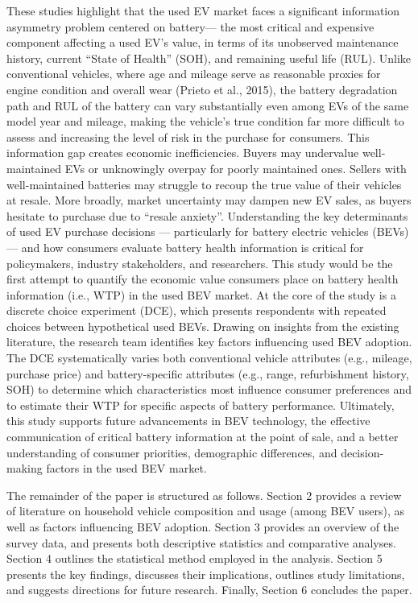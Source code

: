 \documentclass[a4paper,fleqn]{cas-sc}   %
\begin{document}
These studies highlight that the used EV market faces a significant information asymmetry problem centered on battery— the most critical and expensive component affecting a used EV’s value, in terms of its unobserved maintenance history, current “State of Health” (SOH), and remaining useful life (RUL). Unlike conventional vehicles, where age and mileage serve as reasonable proxies for engine condition and overall wear (Prieto et al., 2015), the battery degradation path and RUL of the battery can vary substantially even among EVs of the same model year and mileage, making the vehicle's true condition far more difficult to assess and increasing the level of risk in the purchase for consumers. This information gap creates economic inefficiencies. Buyers may undervalue well-maintained EVs or unknowingly overpay for poorly maintained ones. Sellers with well-maintained batteries may struggle to recoup the true value of their vehicles at resale. More broadly, market uncertainty may dampen new EV sales, as buyers hesitate to purchase due to “resale anxiety”.
Understanding the key determinants of used EV purchase decisions — particularly for battery electric vehicles (BEVs) — and how consumers evaluate battery health information is critical for policymakers, industry stakeholders, and researchers. This study would be the first attempt to quantify the economic value consumers place on battery health information (i.e., WTP) in the used BEV market. At the core of the study is a discrete choice experiment (DCE), which presents respondents with repeated choices between hypothetical used BEVs. Drawing on insights from the existing literature, the research team identifies key factors influencing used BEV adoption. The DCE systematically varies both conventional vehicle attributes (e.g., mileage, purchase price) and battery-specific attributes (e.g., range, refurbishment history, SOH) to determine which characteristics most influence consumer preferences and to estimate their WTP for specific aspects of battery performance. Ultimately, this study supports future advancements in BEV technology, the effective communication of critical battery information at the point of sale, and a better understanding of consumer priorities, demographic differences, and decision-making factors in the used BEV market.

The remainder of the paper is structured as follows. Section 2 provides a review of literature on household vehicle composition and usage (among BEV users), as well as factors influencing BEV adoption. Section 3 provides an overview of the survey data, and presents both descriptive statistics and comparative analyses. Section 4 outlines the statistical method employed in the analysis. Section 5 presents the key findings, discusses their implications, outlines study limitations, and suggests directions for future research. Finally, Section 6 concludes the paper.
\end{document}
